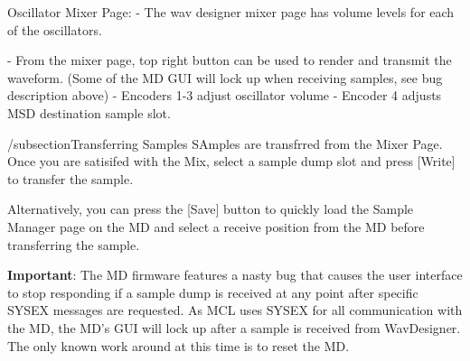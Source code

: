 Oscillator Mixer Page:
- The wav designer mixer page has volume levels for each of the oscillators.

- From the mixer page, top right button can be used to render and transmit the waveform.
(Some of the  MD GUI will lock up when receiving samples, see bug description
above)
- Encoders 1-3 adjust oscillator volume
- Encoder 4 adjusts MSD destination sample slot.

/subsection{Transferring Samples}
SAmples are transfrred from the Mixer Page. Once you are satisifed with the Mix, select a sample dump slot and press [Write] to transfer the sample. 

Alternatively, you can press the [Save] button to quickly load the Sample Manager page on the MD and select a receive position from the MD before transferring the sample.

\textbf{Important}: The MD firmware features a nasty bug that causes the user interface to stop responding if a sample dump is received at any point after specific SYSEX messages are requested. As MCL uses SYSEX for all communication with the MD, the MD's GUI will lock up after a sample is received from WavDesigner. The only known work around at this time is to reset the MD.